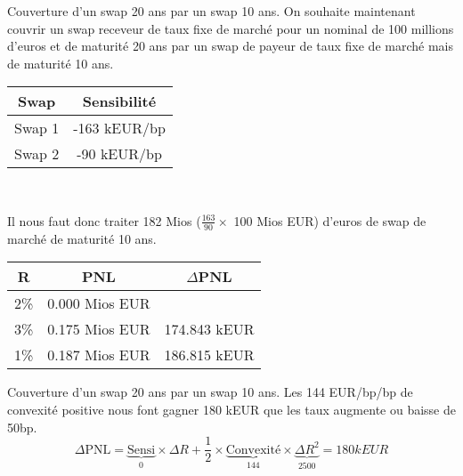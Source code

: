 \documentclass{beamer}
\begin{document}
\begin{frame}{Couverture d'un swap 20 ans par un swap 10 ans.}
On souhaite maintenant couvrir un swap receveur de taux fixe de marché pour un nominal de 100 millions d'euros et de maturité 20 ans par un swap de payeur de taux fixe de marché mais de maturité 10 ans.\\
\begin{center}
\begin{tabular}{|c|c|}
\hline
Swap&Sensibilité \\ 
\hline
Swap 1 &-163 kEUR/bp \\ 
Swap 2 &-90 kEUR/bp \\ 
\hline
\end{tabular}\\
\end{center}
Il nous faut donc traiter 182 Mios ($\frac{163}{90} \times$ 100 Mios EUR)  d'euros de swap de marché de maturité 10 ans.
\begin{center}
\begin{tabular}{|c|c|c|}
\hline
R&PNL&$\Delta$PNL \\
\hline
2\% &0.000 Mios EUR& \\ 
3\% &0.175 Mios EUR&174.843 kEUR\\
1\% &0.187 Mios EUR&186.815 kEUR\\
\hline
\end{tabular}
\end{center}
\end{frame}
\begin{frame}{Couverture d'un swap 20 ans par un swap 10 ans.}
Les 144 EUR/bp/bp de convexité positive nous font gagner 180 kEUR que les taux augmente ou baisse de 50bp.
\[
\Delta \text{PNL}=\underbrace{\text{Sensi}}_{0} \times \Delta R + \frac{1}{2} \times \underbrace{\text{Convexité}}_{144} \times \underbrace{\Delta R^2}_{2500}=180 kEUR
\]
\end{frame}
\end{document}
